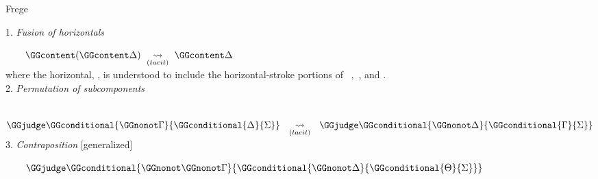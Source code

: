 \begin{entry}{Frege}
\begin{calculus}








						
\begin{minipage}[t]{.48\textwidth}
1. \emph{Fusion of horizontals} 

~~~~$ \GGcontent (\GGcontent \Delta) \  \underset{(tacit)}{\rightsquigarrow} \    \GGcontent \Delta$\\ 
where the horizontal, \GGcontent, is understood to include the horizontal-stroke portions of \, \GGnotalone,\, \GGconditional{}{}, and\: \GGall{}.\\

2. \emph{Permutation of subcomponents}

~~~~$\GGjudge\GGconditional{\GGnonot\Gamma}{\GGconditional{\Delta}{\Sigma}} \  \ \underset{(tacit)}{\rightsquigarrow} \ \ \GGjudge\GGconditional{\GGnonot\Delta}{\GGconditional{\Gamma}{\Sigma}}$ \\

3. \emph{Contraposition} [generalized]

~~~~$\GGjudge\GGconditional{\GGnonot\GGnonot\Gamma}{\GGconditional{\GGnonot\Delta}{\GGconditional{\Theta}{\Sigma}}}$


\end{minipage}
\end{calculus}
\end{entry}

